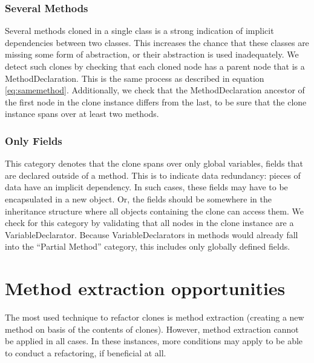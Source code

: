 \subsubsection{Several Methods}
Several methods cloned in a single class is a strong indication of implicit dependencies between two classes. This increases the chance that these classes are missing some form of abstraction, or their abstraction is used inadequately. We detect such clones by checking that each cloned node has a parent node that is a MethodDeclaration. This is the same process as described in equation \ref{eq:samemethod}. Additionally, we check that the MethodDeclaration ancestor of the first node in the clone instance differs from the last, to be sure that the clone instance spans over at least two methods.

\subsubsection{Only Fields}
This category denotes that the clone spans over only global variables, fields that are declared outside of a method. This is to indicate data redundancy: pieces of data have an implicit dependency. In such cases, these fields may have to be encapsulated in a new object. Or, the fields should be somewhere in the inheritance structure where all objects containing the clone can access them. We check for this category by validating that all nodes in the clone instance are a VariableDeclarator. Because VariableDeclarators in methods would already fall into the ``Partial Method'' category, this includes only globally defined fields.

\section{Method extraction opportunities}\label{sec:refactorabilitysetup}
The most used technique to refactor clones is method extraction (creating a new method on basis of the contents of clones). However, method extraction cannot be applied in all cases. In these instances, more conditions may apply to be able to conduct a refactoring, if beneficial at all.

